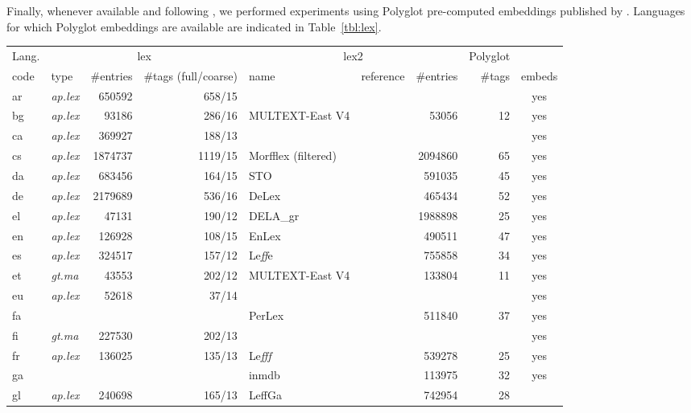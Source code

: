 \documentclass[11pt,letterpaper]{article}
\begin{document}
Finally, whenever available and following \citet{plank16}, we performed experiments using Polyglot pre-computed
embeddings published by \citet{alrfou13}. Languages for which Polyglot embeddings are available are indicated in Table~\ref{tbl:lex}.

\begin{table}
\centering
\scriptsize
\begin{tabular}{l|lrr|llrrc}
\toprule
Lang. & \multicolumn{3}{c}{\sc lex} & \multicolumn{3}{|c}{\sc lex2} & Polyglot\\
code & type & \#entries & \#tags (full/coarse) & name & reference & \#entries & \#tags & embeds\\
\midrule
ar & {\em ap.lex} & 650592 & 658/15 &  &  &  &  & yes\\
bg & {\em ap.lex} & 93186 & 286/16 & MULTEXT-East V4 & \citep{erjavec10} & 53056 & 12 & yes\\
ca & {\em ap.lex} & 369927 & 188/13 &  &  &  &  & yes\\
cs & {\em ap.lex} & 1874737 & 1119/15 & Morfflex (filtered) & \citep{hajic13} & 2094860 & 65 & yes\\
da & {\em ap.lex} & 683456 & 164/15 & STO & \citep{braasch08} & 591035 & 45 & yes\\
de & {\em ap.lex} & 2179689 & 536/16 & DeLex & \citep{sagot14delex} & 465434 & 52 & yes\\
el & {\em ap.lex} & 47131 & 190/12 & DELA\_gr & \citep{symeonidis99} & 1988898 & 25 & yes\\
en & {\em ap.lex} & 126928 & 108/15 & EnLex & \citep{sagot10lefff} & 490511 & 47 & yes\\
es & {\em ap.lex} & 324517 & 157/12 & Le{\it ff}e & \citep{molinero09} & 755858 & 34 & yes\\
et & {\em gt.ma} & 43553 & 202/12 & MULTEXT-East V4 & \citep{erjavec10} & 133804 & 11 & yes\\
eu & {\em ap.lex} & 52618 & 37/14 &  &  &  &  & yes\\
fa &  &  &  & PerLex & \citep{sagot10perlex} & 511840 & 37 & yes\\
fi & {\em gt.ma} & 227530 & 202/13 &  &  &  &  & yes\\
fr & {\em ap.lex} & 136025 & 135/13 & Le{\it fff} & \citep{sagot10lefff} & 539278 & 25 & yes\\
ga &  &  &  & inmdb & \citep{mechura14} & 113975 & 32 & yes\\
gl & {\em ap.lex} & 240698 & 165/13 & LeffGa & \citep{sagot10lefff} & 742954 & 28 & \\

\end{tabular}
\end{table}
\end{document}
